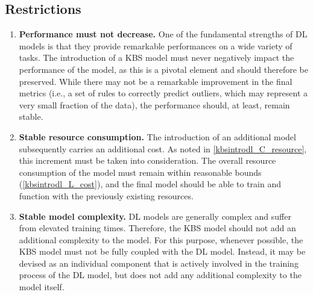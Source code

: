\subsection{Restrictions}
\begin{enumerate} [start=1,label={\bfseries R\arabic*.}]
    \item \label{kbsintrodl_R_performance} \textbf{Performance must not decrease.} One of the fundamental strengths of DL models is that they provide remarkable performances on a wide variety of tasks. The introduction of a KBS model must never negatively impact the performance of the model, as this is a pivotal element and should therefore be preserved. While there may not be a remarkable improvement in the final metrics (i.e., a set of rules to correctly predict outliers, which may represent a very small fraction of the data), the performance should, at least, remain stable.
    
    \item \label{kbsintrodl_R_resource} \textbf{Stable resource consumption.} The introduction of an additional model subsequently carries an additional cost. As noted in \ref{kbsintrodl_C_resource}, this increment must be taken into consideration. The overall resource consumption of the model must remain within reasonable bounds (\ref{kbsintrodl_L_cost}), and the final model should be able to train and function with the previously existing resources.
    
    \item \label{kbsintrodl_R_complexity} \textbf{Stable model complexity.} DL models are generally complex and suffer from elevated training times. Therefore, the KBS model should not add an additional complexity to the model. For this purpose, whenever possible, the KBS model must not be fully coupled with the DL model. Instead, it may be devised as an individual component that is actively involved in the training process of the DL model, but does not add any additional complexity to the model itself. 
    
\end{enumerate}
